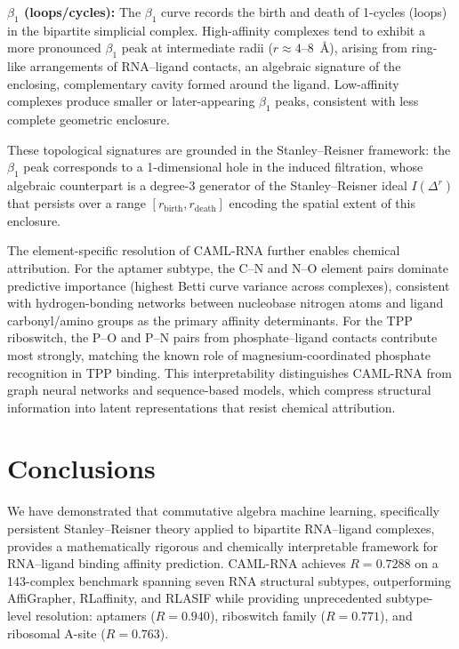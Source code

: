 \documentclass[10pt,twocolumn]{article}
\begin{document}
\textbf{$\beta_1$ (loops/cycles):}
The $\beta_1$ curve records the birth and death of 1-cycles (loops) in the
bipartite simplicial complex.
High-affinity complexes tend to exhibit a more pronounced $\beta_1$ peak at
intermediate radii ($r \approx 4$--8~\AA), arising from ring-like arrangements
of RNA--ligand contacts, an algebraic signature of the enclosing, complementary
cavity formed around the ligand.
Low-affinity complexes produce smaller or later-appearing $\beta_1$ peaks,
consistent with less complete geometric enclosure.

These topological signatures are grounded in the Stanley--Reisner framework:
the $\beta_1$ peak corresponds to a 1-dimensional hole in the induced filtration,
whose algebraic counterpart is a degree-3 generator of the Stanley--Reisner ideal
$I(\Delta^{r})$ that persists over a range $[r_{\mathrm{birth}}, r_{\mathrm{death}}]$
encoding the spatial extent of this enclosure.

The element-specific resolution of CAML-RNA further enables chemical attribution.
For the aptamer subtype, the C--N and N--O element pairs dominate predictive
importance (highest Betti curve variance across complexes), consistent with
hydrogen-bonding networks between nucleobase nitrogen atoms and ligand
carbonyl/amino groups as the primary affinity determinants.
For the TPP riboswitch, the P--O and P--N pairs from phosphate--ligand
contacts contribute most strongly, matching the known role of magnesium-coordinated
phosphate recognition in TPP binding.
This interpretability distinguishes CAML-RNA from graph neural networks and
sequence-based models, which compress structural information into latent
representations that resist chemical attribution.


\section{Conclusions}

We have demonstrated that commutative algebra machine learning,
specifically persistent Stanley--Reisner theory applied to bipartite RNA--ligand
complexes, provides a mathematically rigorous and chemically interpretable
framework for RNA--ligand binding affinity prediction.
CAML-RNA achieves $R = 0.7288$ on a 143-complex benchmark spanning seven RNA
structural subtypes, outperforming AffiGrapher, RLaffinity, and RLASIF while
providing unprecedented subtype-level resolution: aptamers ($R = 0.940$),
riboswitch family ($R = 0.771$), and ribosomal A-site ($R = 0.763$).
\end{document}
